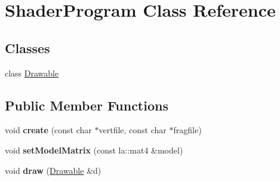 \hypertarget{class_shader_program}{}\section{Shader\+Program Class Reference}
\label{class_shader_program}
\subsection*{Classes}
\begin{DoxyCompactItemize}
\item 
class \hyperlink{class_shader_program_1_1_drawable}{Drawable}
\end{DoxyCompactItemize}
\subsection*{Public Member Functions}
\begin{DoxyCompactItemize}
\item 
\hypertarget{class_shader_program_a14461219e634ed659cdb7c049a109eae}{}void {\bfseries create} (const char $\ast$vertfile, const char $\ast$fragfile)\label{class_shader_program_a14461219e634ed659cdb7c049a109eae}

\item 
\hypertarget{class_shader_program_a6b9123f0ce7f9eb5f05ccacbff502553}{}void {\bfseries set\+Model\+Matrix} (const la\+::mat4 \&model)\label{class_shader_program_a6b9123f0ce7f9eb5f05ccacbff502553}

\item 
\hypertarget{class_shader_program_a4ae7594071ac9d9e58ca10b9b9d6fc00}{}void {\bfseries draw} (\hyperlink{class_shader_program_1_1_drawable}{Drawable} \&d)\label{class_shader_program_a4ae7594071ac9d9e58ca10b9b9d6fc00}

\end{DoxyCompactItemize}
